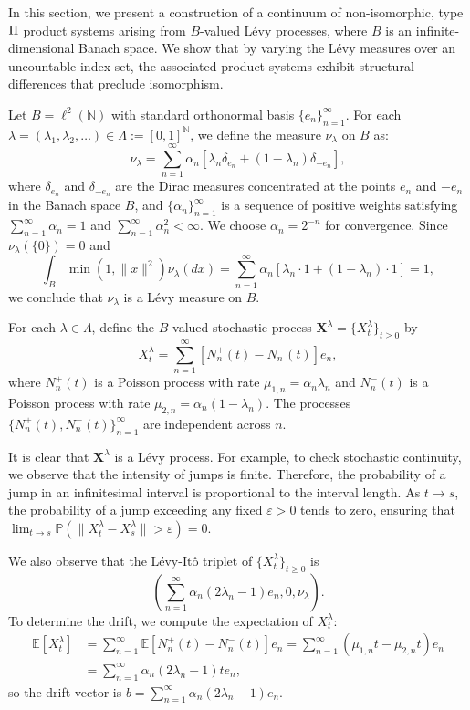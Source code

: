\documentclass[11pt]{amsart}
\theoremstyle{definition}
\theoremstyle{remark}
\numberwithin{equation}{section}
\begin{document}
In this section, we present a construction of a continuum of non-isomorphic, type \(\rm{II}\) product systems arising from \( B \)-valued L\'evy processes, where \( B \) is an infinite-dimensional Banach space. We show that by varying the L\'evy measures over an uncountable index set, the associated product systems exhibit structural differences that preclude isomorphism.


Let \( B = \ell^2(\mathbb{N}) \) with standard orthonormal basis \( \{e_n\}_{n=1}^\infty \). For each \( \lambda = (\lambda_1, \lambda_2, \dots) \in \Lambda:= [0,1]^\mathbb{N} \), we define the measure \( \nu_\lambda \) on \( B \) as:
\[
\nu_\lambda = \sum_{n=1}^\infty \alpha_n \left[ \lambda_n \delta_{e_n} + (1 - \lambda_n) \delta_{-e_n} \right],
\]
where \( \delta_{e_n} \) and  \( \delta_{-e_n} \) are the Dirac measures concentrated at the points \( e_n \) and \(- e_n \) in the Banach space \(B\), and \( \{\alpha_n\}_{n=1}^\infty \) is a sequence of positive weights satisfying \( \sum_{n=1}^\infty \alpha_n = 1 \) and \( \sum_{n=1}^\infty \alpha_n^2 < \infty \). We choose \( \alpha_n = 2^{-n} \) for convergence. Since \(\nu_\lambda(\{0\})=0\) and 
\[
\int _B\min(1, \|x\|^2)\nu_\lambda(dx)=\sum_{n=1}^\infty\alpha_n[\lambda_n\cdot 1+(1-\lambda_n)\cdot 1]=1,
\]
we conclude that \(\nu_\lambda\) is a L\'evy measure on \(B\).

For each \( \lambda \in \Lambda \), define the \( B \)-valued stochastic process \(\bm{X}^\lambda= \{X_t^\lambda\}_{t \geq 0} \) by
\[
X_t^\lambda = \sum_{n=1}^\infty \left[ N_n^+(t) - N_n^-(t) \right] e_n,
\]
where \( N_n^+(t) \) is a Poisson process with rate \( \mu_{1,n}=\alpha_n \lambda_n \) and \( N_n^-(t) \) is a Poisson process with rate \(\mu_{2,n}=\alpha_n (1 - \lambda_n) \).
The processes \( \{N_n^+(t), N_n^-(t)\}_{n=1}^\infty \) are independent across \(n\). 

It is clear that \(\bm{X}^\lambda\) is a L\'evy process. For example, to check stochastic continuity, we observe that the intensity of jumps is finite. Therefore, the probability of a jump in an infinitesimal interval is proportional to the interval length. As \(t\to s\), the probability of a jump exceeding any fixed \(\varepsilon >0\) tends to zero, ensuring that \(
\lim_{t\to s}\mathbb{P}(\|X_t^\lambda-X_s^\lambda\|>\varepsilon)=0.
\) 

We also observe that the L\'evy-It\^o triplet of  \(\{X_t^\lambda\}_{t \geq 0}\) is \[\left(\sum_{n=1}^\infty \alpha_n(2\lambda_n-1)e_n, 0, \nu_\lambda\right).\]
To determine the drift, we compute the expectation of \(X_t^\lambda\): 
\begin{align*}\mathbb{E}[X_t^\lambda]&=\sum_{n=1}^\infty \mathbb{E}\left[ N_n^+(t) - N_n^-(t) \right] e_n= \sum_{n=1}^\infty(\mu_{1,n}t-\mu_{2,n}t)e_n\\&= \sum_{n=1}^\infty\alpha_n(2\lambda_n-1)te_n,\end{align*}
so the drift vector is \(
b= \sum_{n=1}^\infty\alpha_n(2\lambda_n-1)e_n.\)
\end{document}
